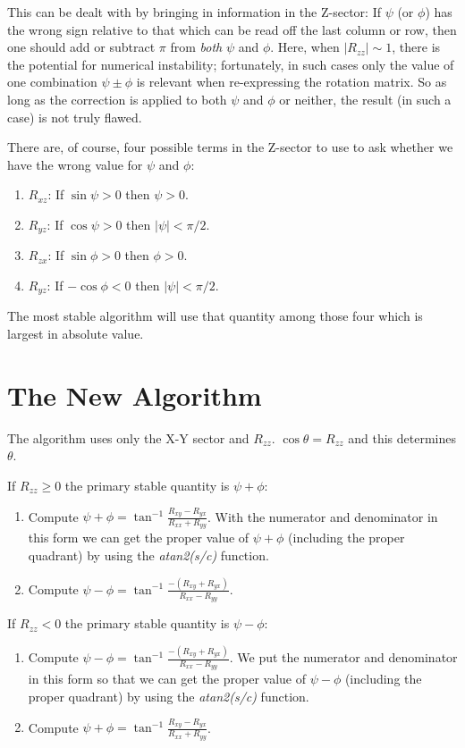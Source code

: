 This can be dealt with by bringing in information in the Z-sector:
If $\psi$ (or $\phi$) has the wrong sign relative to that which can be read off
the last column or row, then one should add or subtract $\pi$ from {\em both} 
$\psi$ and $\phi$.
Here, when $|R_{zz}| \sim 1$, there is the potential for numerical instability;
fortunately, in such cases only the value of one combination $\psi \pm \phi$
is relevant when re-expressing the rotation matrix.  So as long as the
correction is applied to both $\psi$ and $\phi$ or neither, the result (in
such a case) is not truly flawed.

There are, of course, four possible terms in the Z-sector to use to ask whether
we have the wrong value for $\psi$ and $\phi$:
\begin{enumerate}
\item
$R_{xz}$: If $\sin \psi > 0$ then $\psi > 0$.
\item
$R_{yz}$: If $\cos \psi > 0$ then $|\psi| < \pi/2$.
\item
$R_{zx}$: If $\sin \phi > 0$ then $\phi > 0$.
\item
$R_{yz}$: If $-\cos \phi < 0$ then $|\psi| < \pi/2$.
\end{enumerate}

The most stable algorithm will use that quantity among those four which is
largest in absolute value.
 

\section{The New Algorithm}

The algorithm uses only the X-Y sector and $R_{zz}$.
$\cos \theta = R_{zz}$ and this determines $\theta$.
 
\noindent
If $ R_{zz} \geq 0$ the primary stable quantity is $\psi + \phi$:
\begin{enumerate}
\item
Compute $\psi + \phi = \tan^{-1} \frac{R_{xy} - R_{yx}}{R_{xx} + R_{yy}}$.
With the numerator and denominator in this form we can get the 
proper value of $\psi + \phi$ (including the proper quadrant) by using the
{\em atan2(s/c)} function.
\item
Compute $\psi - \phi = \tan^{-1} \frac{-(R_{xy} + R_{yx})}{R_{xx} - R_{yy}}$.
\end{enumerate}

\noindent
If $ R_{zz} < 0$ the primary stable quantity is $\psi - \phi$:
\begin{enumerate}
\item
Compute $\psi - \phi = \tan^{-1} \frac{-(R_{xy} + R_{yx})}{R_{xx} - R_{yy}}$.
We put the numerator and denominator in this form so that we can get the 
proper value of $\psi - \phi$ (including the proper quadrant) by using the
{\em atan2(s/c)} function.
\item
Compute $\psi + \phi = \tan^{-1} \frac{R_{xy} - R_{yx}}{R_{xx} + R_{yy}}$.
\end{enumerate}

